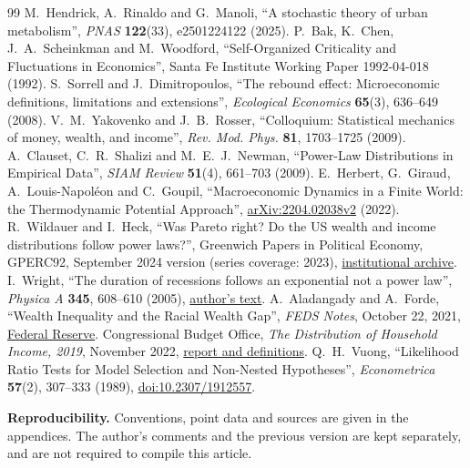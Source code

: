 \documentclass[10pt,a4paper]{article}
\begin{document}
\vspace{0.3cm}

\FloatBarrier
\clearpage
\begin{thebibliography}{99}\small
{} M.~Hendrick, A.~Rinaldo and G.~Manoli,
  ``A stochastic theory of urban metabolism'', \emph{PNAS} \textbf{122}(33),
  e2501224122 (2025).
 P.~Bak, K.~Chen, J.~A.~Scheinkman and M.~Woodford,
  ``Self-Organized Criticality and Fluctuations in Economics'',
  Santa Fe Institute Working Paper 1992-04-018 (1992).
 S.~Sorrell and J.~Dimitropoulos,
  ``The rebound effect: Microeconomic definitions, limitations and extensions'',
  \emph{Ecological Economics} \textbf{65}(3), 636--649 (2008).
 V.~M.~Yakovenko and J.~B.~Rosser,
  ``Colloquium: Statistical mechanics of money, wealth, and income'',
  \emph{Rev. Mod. Phys.} \textbf{81}, 1703--1725 (2009).
 A.~Clauset, C.~R.~Shalizi and M.~E.~J.~Newman,
  ``Power-Law Distributions in Empirical Data'', \emph{SIAM Review}
  \textbf{51}(4), 661--703 (2009).
 E.~Herbert, G.~Giraud, A.~Louis-Napol\'eon and C.~Goupil,
  ``Macroeconomic Dynamics in a Finite World: the Thermodynamic Potential
  Approach'', \href{https://arxiv.org/abs/2204.02038v2}{arXiv:2204.02038v2} (2022).
 R.~Wildauer and I.~Heck,
  ``Was Pareto right? Do the US wealth and income distributions follow power
  laws?'', Greenwich Papers in Political Economy, GPERC92, September 2024
  version (series coverage: 2023),
  \href{https://gala.gre.ac.uk/id/eprint/38597/}{institutional archive}.
 I.~Wright, ``The duration of recessions follows an
  exponential not a power law'', \emph{Physica A} \textbf{345}, 608--610
  (2005), \href{https://arxiv.org/abs/cond-mat/0311585}{author's text}.
 A.~Aladangady and A.~Forde, ``Wealth Inequality and the
  Racial Wealth Gap'', \emph{FEDS Notes}, October 22, 2021,
  \href{https://www.federalreserve.gov/econres/notes/feds-notes/wealth-inequality-and-the-racial-wealth-gap-20211022.html}{Federal Reserve}.
 Congressional Budget Office, \emph{The Distribution of
  Household Income, 2019}, November 2022,
  \href{https://www.cbo.gov/publication/58781}{report and definitions}.
 Q.~H.~Vuong, ``Likelihood Ratio Tests for Model Selection
  and Non-Nested Hypotheses'', \emph{Econometrica} \textbf{57}(2),
  307--333 (1989), \href{https://doi.org/10.2307/1912557}{doi:10.2307/1912557}.
\end{thebibliography}

\noindent\textbf{Reproducibility.} Conventions, point data and sources
are given in the appendices. The author's comments and the previous
version are kept separately, and are not required to compile this
article.
\clearpage

\end{document}
